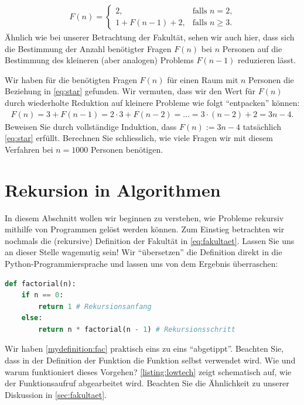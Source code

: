 \begin{align}\label{eq:star}
    F(n) =
    \begin{cases}
        2, &\text{falls $n=2$,} \\
        1 + F(n-1) + 2, & \text{falls  $n\geq 3$.}
      \end{cases}
\end{align}
Ähnlich wie bei unserer Betrachtung der Fakultät, sehen wir auch hier, dass sich die Bestimmung der Anzahl benötigter Fragen $F(n)$ bei $n$ Personen auf die Bestimmung des kleineren (aber analogen) Problems $F(n-1)$ reduzieren lässt.
\begin{myexercise}\label{myexercise:0352}
Wir haben für die benötigten Fragen $F(n)$ für einen Raum mit $n$ Personen die Beziehung in \cref{eq:star} gefunden. Wir vermuten, dass wir den Wert für $F(n)$ durch wiederholte Reduktion auf kleinere Probleme wie folgt \enquote{entpacken} können:
\begin{align*}
    F(n) = 3 + F(n-1) = 2\cdot 3 + F(n-2) = \ldots = 3\cdot (n-2) + 2 = 3n - 4.
\end{align*}
Beweisen Sie durch vollständige Induktion, dass $F(n) := 3n - 4$ tatsächlich \cref{eq:star} erfüllt. Berechnen Sie schliesslich, wie viele Fragen wir mit diesem Verfahren bei $n = 1000$ Personen benötigen.
\end{myexercise}

\clearpage
\section{Rekursion in Algorithmen}
In diesem Abschnitt wollen wir beginnen zu verstehen, wie Probleme rekursiv mithilfe von Programmen gelöst werden können. Zum Einstieg betrachten wir nochmals die (rekursive) Definition der Fakultät in \cref{eq:fakultaet}. Lassen Sie uns an dieser Stelle wagemutig sein! Wir \enquote{übersetzen} die Definition direkt in die Python-Programmiersprache und lassen uns von dem Ergebnis überraschen:
\begin{lstlisting}[language=Python,caption=rekursive Fakultäts-Funktion]
def factorial(n):
    if n == 0:
        return 1 # Rekursionsanfang
    else:
        return n * factorial(n - 1) # Rekursionsschritt
\end{lstlisting}
Wir haben \cref{mydefinition:fac} praktisch eins zu eins \enquote{abgetippt}. Beachten Sie, dass in der Definition der Funktion  die Funktion  selbst verwendet wird. Wie und warum funktioniert dieses Vorgehen? \cref{listing:lowtech} zeigt schematisch auf, wie der Funktionsaufruf  abgearbeitet wird. Beachten Sie die Ähnlichkeit zu unserer Diskussion in \cref{sec:fakultaet}. 

